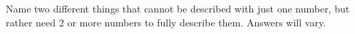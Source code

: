 {Name two different things that cannot be described with just one number, but rather need 2 or more numbers to fully describe them.
}
{Answers will vary.
}

